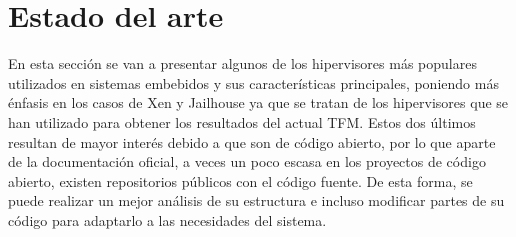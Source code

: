 \chapter{Estado del arte}
En esta sección se van a presentar algunos de los hipervisores más populares utilizados en sistemas embebidos y sus características principales, poniendo más énfasis en los casos de Xen y Jailhouse ya que se tratan de los hipervisores que se han utilizado para obtener los resultados del actual TFM. Estos dos últimos resultan de mayor interés debido a que son de código abierto, por lo que aparte de la documentación oficial, a veces un poco escasa en los proyectos de código abierto, existen repositorios públicos con el código fuente. De esta forma, se puede realizar un mejor análisis de su estructura e incluso modificar partes de su código para adaptarlo a las necesidades del sistema.

